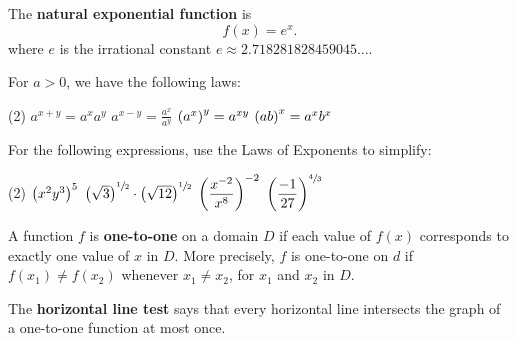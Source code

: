 \documentclass[mathNotesPreamble]{subfiles}
\begin{document}
  \begin{defn*}
    The \textbf{natural exponential function} is 
      \[f(x)=e^x.\]
    where $e$ is the irrational constant $e\approx2.718281828459045\dots$.
  \end{defn*}
  \pagebreak
  
  \begin{thmBox*}
    For $a>0$, we have the following laws:
    \begin{tasks}(2)
      \task $a^{x+y}=a^xa^y$
      \task $a^{x-y}=\frac{a^x}{a^y}$
      \task $\parens{a^x}^y=a^{xy}$
      \task $\parens{ab}^x=a^xb^x$
    \end{tasks}
  \end{thmBox*}

  \begin{ex*}
    For the following expressions, use the Laws of Exponents to simplify:
  \end{ex*}
  \begin{tasks}[after-item-skip=\stretch{1}](2)
    \task $\parens{x^2y^3}^5$
    \task $\parens{\sqrt 3}^{\sfrac{1}{2}}\cdot\parens{\sqrt{12}}^{\sfrac{1}{2}}$
    \task $\parens{\dfrac{x\inv[2]}{x^8}}\inv[2]$
    \task $\parens{\dfrac{-1}{27}}^{\sfrac{4}{3}}$
  \end{tasks}
  \pagebreak
  
  \begin{defn*}
    A function $f$ is \textbf{one-to-one} on a domain $D$ if each value of $f(x)$ corresponds to exactly one value of $x$ in $D$. More precisely, $f$ is one-to-one on $d$ if $f(x_1)\neq f(x_2)$ whenever $x_1\neq x_2$, for $x_1$ and $x_2$ in $D$. 
    
    The \textbf{horizontal line test} says that every horizontal line intersects the graph of a one-to-one function at most once.
  \end{defn*}
\end{document}
